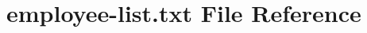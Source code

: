 \hypertarget{employee-list_8txt}{}\section{employee-\/list.txt File Reference}
\label{employee-list_8txt}
